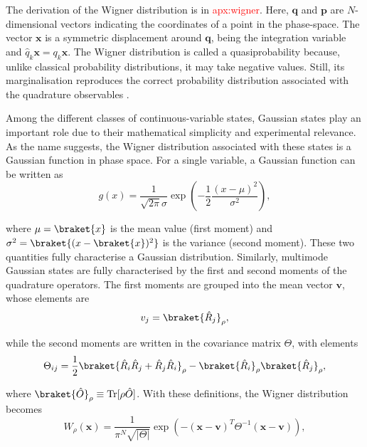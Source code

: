 \noindent The derivation of the Wigner distribution is in \textcolor{red}{apx:wigner}. Here, $\mathbf{q}$ and $\mathbf{p}$ are $N$-dimensional vectors indicating the coordinates of a point in the phase-space. The vector $\mathbf{x}$ is a symmetric displacement around $\mathbf{q}$, being the integration variable and $\hat{q}_k \mathbf{x} = q_k \mathbf{x}$. The Wigner distribution is called a quasiprobability because, unlike classical probability distributions, it may take negative values. Still, its marginalisation reproduces the correct probability distribution associated with the quadrature observables \cite{gerardo-2014}.

Among the different classes of continuous-variable states, Gaussian states play an important role due to their mathematical simplicity and experimental relevance. As the name suggests, the Wigner distribution associated with these states is a Gaussian function in phase space. For a single variable, a Gaussian function can be written as
\begin{equation}
    g(x) = \frac{1}{\sqrt{2\pi} \sigma} \exp \left(-\frac{1}{2} \frac{(x - \mu)^2}{\sigma^2} \right),
\end{equation}

\noindent where $\mu = \braket{x}$ is the mean value (first moment) and $\sigma^2 = \braket{(x -  \braket{x})^2}$ is the variance (second moment). These two quantities fully characterise a Gaussian distribution. Similarly, multimode Gaussian states are fully characterised by the first and second moments of the quadrature operators. The first moments are grouped into the mean vector $\mathbf{v}$, whose elements are
\begin{equation}
    v_j = \braket{\hat{R}_j}_\rho,
\end{equation}

\noindent while the second moments are written in the covariance matrix $\Theta$, with elements
\begin{equation}
    \Theta_{ij} = \frac{1}{2}\braket{\hat{R}_i \hat{R}_j + \hat{R}_j \hat{R}_i}_\rho - \braket{\hat{R}_i}_\rho \braket{\hat{R}_j}_\rho,
\end{equation}

\noindent where $\braket{\hat{O}}_\rho \equiv \text{Tr}[\rho \hat{O}]$. With these definitions, the Wigner distribution becomes
\begin{equation}
    W_\rho (\mathbf{x}) = \frac{1}{\pi^N \sqrt{|\Theta|}} \exp \left( -(\mathbf{x} - \mathbf{v})^T \Theta^{-1} (\mathbf{x} - \mathbf{v}) \right),
\end{equation}

